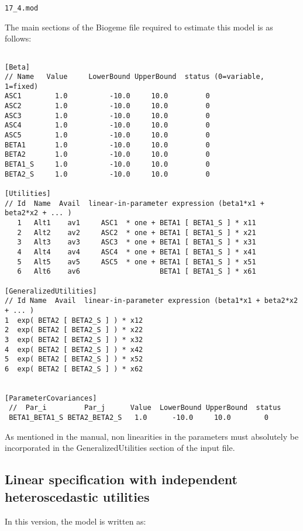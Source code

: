 \documentclass[12pt]{memoir}
\begin{document}
\begin{flushright}
  \verb+17_4.mod+
\end{flushright}
 The main sections of the Biogeme file required to estimate 
this model is as follows:

\tiny
{\footnotesize
\begin{verbatim}
 
[Beta]
// Name   Value     LowerBound UpperBound  status (0=variable, 1=fixed)
ASC1        1.0          -10.0     10.0         0
ASC2        1.0          -10.0     10.0         0
ASC3        1.0          -10.0     10.0         0
ASC4        1.0          -10.0     10.0         0
ASC5        1.0          -10.0     10.0         0
BETA1       1.0          -10.0     10.0         0
BETA2       1.0          -10.0     10.0         0
BETA1_S     1.0          -10.0     10.0         0
BETA2_S     1.0          -10.0     10.0         0
 
[Utilities]
// Id  Name  Avail  linear-in-parameter expression (beta1*x1 + beta2*x2 + ... )
   1   Alt1    av1     ASC1  * one + BETA1 [ BETA1_S ] * x11   
   2   Alt2    av2     ASC2  * one + BETA1 [ BETA1_S ] * x21   
   3   Alt3    av3     ASC3  * one + BETA1 [ BETA1_S ] * x31   
   4   Alt4    av4     ASC4  * one + BETA1 [ BETA1_S ] * x41   
   5   Alt5    av5     ASC5  * one + BETA1 [ BETA1_S ] * x51   
   6   Alt6    av6                   BETA1 [ BETA1_S ] * x61   
  
[GeneralizedUtilities]
// Id Name  Avail  linear-in-parameter expression (beta1*x1 + beta2*x2 + ... )
1  exp( BETA2 [ BETA2_S ] ) * x12
2  exp( BETA2 [ BETA2_S ] ) * x22
3  exp( BETA2 [ BETA2_S ] ) * x32
4  exp( BETA2 [ BETA2_S ] ) * x42
5  exp( BETA2 [ BETA2_S ] ) * x52
6  exp( BETA2 [ BETA2_S ] ) * x62
 
 
[ParameterCovariances]
 //  Par_i         Par_j      Value  LowerBound UpperBound  status 
 BETA1_BETA1_S BETA2_BETA2_S   1.0      -10.0     10.0        0
\end{verbatim}
}
\normalsize

As mentioned in the manual, non linearities in the parameters must absolutely
be incorporated in the GeneralizedUtilities section of the input file.\ 

\subsection{Linear specification with independent heteroscedastic utilities}

In this version, the model is written as:%
\end{document}
